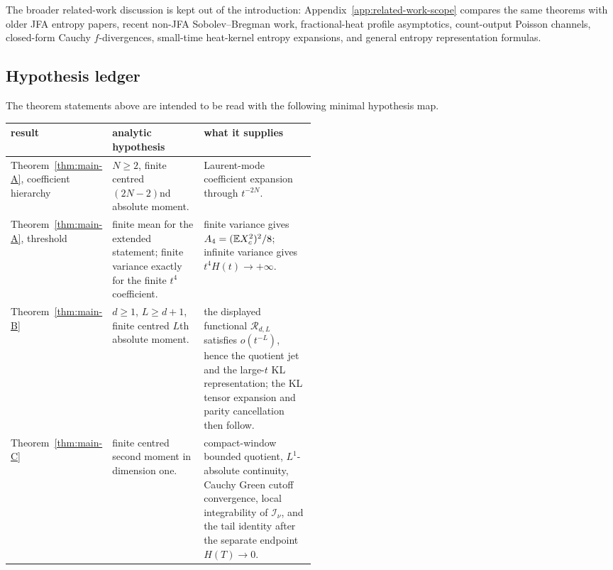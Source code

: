 The broader related-work discussion is kept out of the introduction:
Appendix~\ref{app:related-work-scope} compares the same theorems with older
JFA entropy papers, recent non-JFA Sobolev--Bregman work, fractional-heat
profile asymptotics, count-output Poisson channels, closed-form Cauchy
\(f\)-divergences, small-time heat-kernel entropy expansions, and general
entropy representation formulas.

\subsection*{Hypothesis ledger}
\label{subsec:intro-hypothesis-ledger}

The theorem statements above are intended to be read with the following
minimal hypothesis map.

\begin{center}
{\small
\setlength{\tabcolsep}{4pt}
\renewcommand{\arraystretch}{1.15}
\begin{tabularx}{\linewidth}{>{\raggedright\arraybackslash}p{0.20\linewidth}|%
>{\raggedright\arraybackslash}p{0.30\linewidth}|%
>{\raggedright\arraybackslash}X}
\textbf{result}
& \textbf{analytic hypothesis}
& \textbf{what it supplies}\\
\hline
Theorem~\ref{thm:main-A}, coefficient hierarchy
& \(N\ge2\), finite centred \((2N-2)\)nd absolute moment.
& Laurent-mode coefficient expansion through \(t^{-2N}\).\\
\hline
Theorem~\ref{thm:main-A}, threshold
& finite mean for the extended statement; finite variance exactly for the
finite \(t^4\) coefficient.
& finite variance gives \(A_4=(\mathbb{E} X_c^2)^2/8\); infinite variance gives
\(t^4H(t)\to+\infty\).\\
\hline
Theorem~\ref{thm:main-B}
& \(d\ge1\), \(L\ge d+1\), finite centred \(L\)th absolute moment.
& the displayed functional \(\mathcal R_{d,L}\) satisfies
\(o(t^{-L})\), hence the quotient jet and the large-\(t\) KL representation;
the KL tensor expansion and parity cancellation then follow.\\
\hline
Theorem~\ref{thm:main-C}
& finite centred second moment in dimension one.
& compact-window bounded quotient, \(L^1\)-absolute continuity, Cauchy Green
cutoff convergence, local integrability of \(\mathcal I_\nu\), and the tail
identity after the separate endpoint \(H(T)\to0\).\\
\end{tabularx}
}
\end{center}

